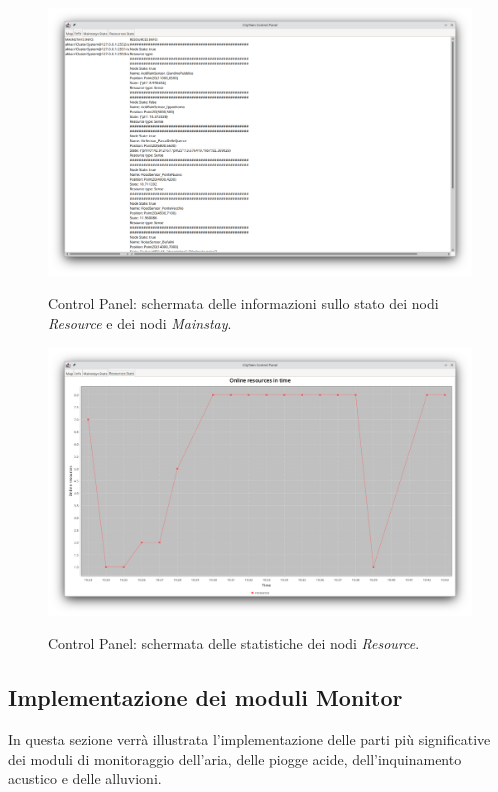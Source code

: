 \documentclass{scrartcl}
\begin{document}
\begin{figure}[H]
    \caption{Control Panel: schermata delle informazioni sullo stato dei nodi \textit{Resource} e dei nodi \textit{Mainstay}.}
    \includegraphics[width=\textwidth]{../assets/images/control-panel-info.png}
    \label{fig:control-panel-info}
\end{figure}

\begin{figure}[H]
    \caption{Control Panel: schermata delle statistiche dei nodi \textit{Resource}.}
    \includegraphics[width=\textwidth]{../assets/images/control-panel-resources-stats.png}
    \label{fig:control-panel-resources-stats}
\end{figure}

\subsection{Implementazione dei moduli Monitor}
In questa sezione verrà illustrata l'implementazione delle parti più significative dei moduli di monitoraggio dell'aria, delle piogge acide, dell'inquinamento acustico e delle alluvioni.
\end{document}
